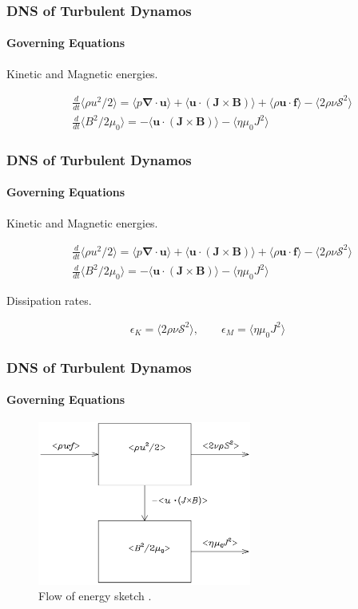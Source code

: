 \documentclass{beamer}
\begin{document}
\begin{frame}
 \frametitle{DNS of Turbulent Dynamos}
 \framesubtitle{Governing Equations}
 
 Kinetic and Magnetic energies.

\begin{align}
  &\frac{d}{dt} \langle \rho u^2 /2 \rangle = \langle p \bm{\nabla \cdot u} \rangle + \langle \bm{u} \cdot (\bm{J} \times \bm{B}) \rangle  + \langle \rho \bm{u \cdot f} \rangle - \langle 2\rho \nu \mathcal{S}^2 \rangle \nonumber \\
  &\frac{d}{dt} \langle B^2 / 2\mu_0 \rangle = - \langle \bm{u} \cdot (\bm{J} \times \bm{B}) \rangle - \langle \eta \mu_0 J^2 \rangle \nonumber
 \end{align}

\end{frame}

\begin{frame}
 \frametitle{DNS of Turbulent Dynamos}
 \framesubtitle{Governing Equations}
 
 Kinetic and Magnetic energies.

 \begin{align}
  &\frac{d}{dt} \langle \rho u^2 /2 \rangle = \langle p \bm{\nabla \cdot u} \rangle + \langle \bm{u} \cdot (\bm{J} \times \bm{B}) \rangle  + \langle \rho \bm{u \cdot f}\rangle - \langle 2\rho \nu \mathcal{S}^2 \rangle  \nonumber \\
  &\frac{d}{dt} \langle B^2 / 2\mu_0 \rangle = - \langle \bm{u} \cdot (\bm{J} \times \bm{B}) \rangle - \langle \eta \mu_0 J^2 \rangle \nonumber
 \end{align}
 
 Dissipation rates.
 
 \begin{align}
  \epsilon_K = \langle 2 \rho \nu \mathcal{S}^2 \rangle, \qquad \epsilon_M = \langle \eta \mu_0 J^2 \rangle \nonumber
 \end{align}



\end{frame}

\begin{frame}
 \frametitle{DNS of Turbulent Dynamos}
 \framesubtitle{Governing Equations}

 \begin{figure}[t]
  \includegraphics[width=7cm]{img/reservoirs}
  \caption{Flow of energy sketch \cite{brandenburg2014magnetic}.}
  \centering
 \end{figure}

\end{frame}
\end{document}

